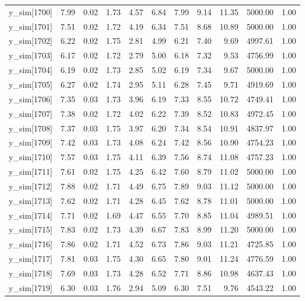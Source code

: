 \begin{table}[ht]
\begin{tabular}{rrrrrrrrrrr}
  y\_sim[1700] & 7.99 & 0.02 & 1.73 & 4.57 & 6.84 & 7.99 & 9.14 & 11.35 & 5000.00 & 1.00 \\ 
  y\_sim[1701] & 7.51 & 0.02 & 1.72 & 4.19 & 6.34 & 7.51 & 8.68 & 10.89 & 5000.00 & 1.00 \\ 
  y\_sim[1702] & 6.22 & 0.02 & 1.75 & 2.81 & 4.99 & 6.21 & 7.40 & 9.69 & 4997.61 & 1.00 \\ 
  y\_sim[1703] & 6.17 & 0.02 & 1.72 & 2.79 & 5.00 & 6.18 & 7.32 & 9.53 & 4756.99 & 1.00 \\ 
  y\_sim[1704] & 6.19 & 0.02 & 1.73 & 2.85 & 5.02 & 6.19 & 7.34 & 9.67 & 5000.00 & 1.00 \\ 
  y\_sim[1705] & 6.27 & 0.02 & 1.74 & 2.95 & 5.11 & 6.28 & 7.45 & 9.71 & 4919.69 & 1.00 \\ 
  y\_sim[1706] & 7.35 & 0.03 & 1.73 & 3.96 & 6.19 & 7.33 & 8.55 & 10.72 & 4749.41 & 1.00 \\ 
  y\_sim[1707] & 7.38 & 0.02 & 1.72 & 4.02 & 6.22 & 7.39 & 8.52 & 10.83 & 4972.45 & 1.00 \\ 
  y\_sim[1708] & 7.37 & 0.03 & 1.75 & 3.97 & 6.20 & 7.34 & 8.54 & 10.91 & 4837.97 & 1.00 \\ 
  y\_sim[1709] & 7.42 & 0.03 & 1.73 & 4.08 & 6.24 & 7.42 & 8.56 & 10.90 & 4754.23 & 1.00 \\ 
  y\_sim[1710] & 7.57 & 0.03 & 1.75 & 4.11 & 6.39 & 7.56 & 8.74 & 11.08 & 4757.23 & 1.00 \\ 
  y\_sim[1711] & 7.61 & 0.02 & 1.75 & 4.25 & 6.42 & 7.60 & 8.79 & 11.02 & 5000.00 & 1.00 \\ 
  y\_sim[1712] & 7.88 & 0.02 & 1.71 & 4.49 & 6.75 & 7.89 & 9.03 & 11.12 & 5000.00 & 1.00 \\ 
  y\_sim[1713] & 7.62 & 0.02 & 1.71 & 4.28 & 6.45 & 7.62 & 8.78 & 11.01 & 5000.00 & 1.00 \\ 
  y\_sim[1714] & 7.71 & 0.02 & 1.69 & 4.47 & 6.55 & 7.70 & 8.85 & 11.04 & 4989.51 & 1.00 \\ 
  y\_sim[1715] & 7.83 & 0.02 & 1.73 & 4.39 & 6.67 & 7.83 & 8.99 & 11.20 & 5000.00 & 1.00 \\ 
  y\_sim[1716] & 7.86 & 0.02 & 1.71 & 4.52 & 6.73 & 7.86 & 9.03 & 11.21 & 4725.85 & 1.00 \\ 
  y\_sim[1717] & 7.81 & 0.03 & 1.75 & 4.30 & 6.65 & 7.80 & 9.01 & 11.24 & 4776.59 & 1.00 \\ 
  y\_sim[1718] & 7.69 & 0.03 & 1.73 & 4.28 & 6.52 & 7.71 & 8.86 & 10.98 & 4637.43 & 1.00 \\ 
  y\_sim[1719] & 6.30 & 0.03 & 1.76 & 2.94 & 5.09 & 6.30 & 7.51 & 9.76 & 4543.22 & 1.00 \\ 

\end{tabular}
\end{table}
